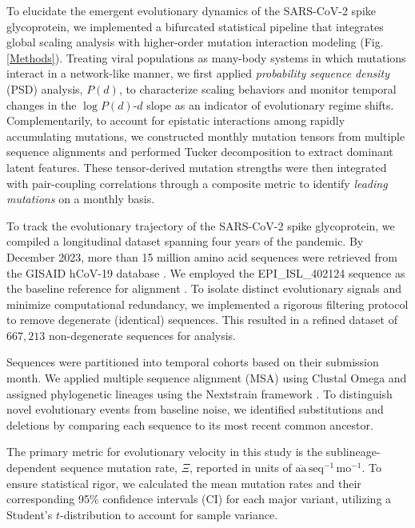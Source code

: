 \documentclass[%
 reprint,
superscriptaddress,
 amsmath,amssymb,
 aps,
]{revtex4-2}
\begin{document}

To elucidate the emergent evolutionary dynamics of the SARS-CoV-2 spike glycoprotein, we implemented a bifurcated statistical pipeline that integrates global scaling analysis with higher-order mutation interaction modeling (Fig.\,\ref{Methods}). Treating viral populations as many-body systems in which mutations interact in a network-like manner, we first applied \textit{probability sequence density} (PSD) analysis, $P(\bm{\mathit{d}})$, to characterize scaling behaviors and monitor temporal changes in the $\log{P(\bm{\mathit{d}})}$-$\bm{\mathit{d}}$ slope as an indicator of evolutionary regime shifts. Complementarily, to account for epistatic interactions among rapidly accumulating mutations, we constructed monthly mutation tensors from multiple sequence alignments and performed Tucker decomposition to extract dominant latent features. These tensor-derived mutation strengths were then integrated with pair-coupling correlations through a composite metric to identify \textit{leading mutations} on a monthly basis.

To track the evolutionary trajectory of the SARS-CoV-2 spike glycoprotein, we compiled a longitudinal dataset spanning four years of the pandemic. By December 2023, more than 15 million amino acid sequences were retrieved from the GISAID hCoV-19 database \cite{gisaid}. We employed the EPI\_ISL\_402124 sequence as the baseline reference for alignment \cite{Zhou2020}. To isolate distinct evolutionary signals and minimize computational redundancy, we implemented a rigorous filtering protocol to remove degenerate (identical) sequences. This resulted in a refined dataset of $667,213$ non-degenerate sequences for analysis.

Sequences were partitioned into temporal cohorts based on their submission month. We applied multiple sequence alignment (MSA) using Clustal Omega \cite{10.1038/msb.2011.75} and assigned phylogenetic lineages using the Nextstrain framework \cite{Hadfield2018}. To distinguish novel evolutionary events from baseline noise, we identified substitutions and deletions by comparing each sequence to its most recent common ancestor.

The primary metric for evolutionary velocity in this study is the sublineage-dependent sequence mutation rate, $\Xi$, reported in units of $\overline{\text{aa}}\, \text{seq}^{-1}\, \text{mo}^{-1}$. To ensure statistical rigor, we calculated the mean mutation rates and their corresponding 95\% confidence intervals (CI) for each major variant, utilizing a Student’s $t$-distribution to account for sample variance.
\end{document}
